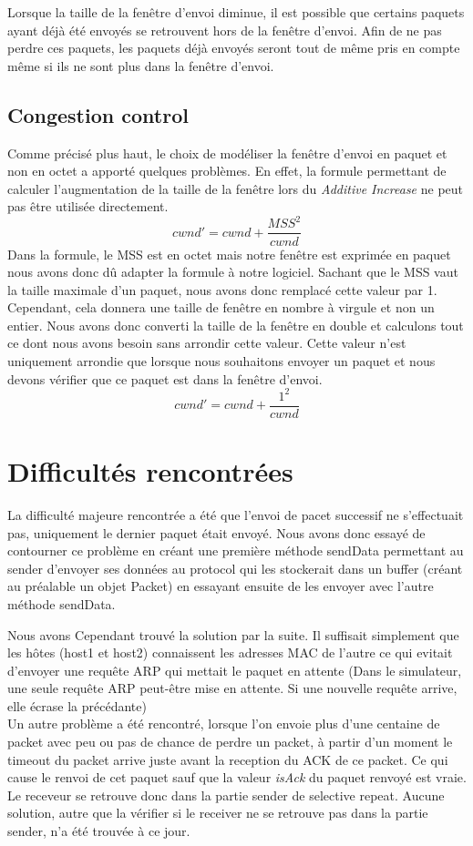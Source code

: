 \documentclass{article}
\begin{document}
Lorsque la taille de la fenêtre d'envoi diminue, il est possible que certains paquets ayant déjà été envoyés se retrouvent hors de la fenêtre d'envoi.
Afin de ne pas perdre ces paquets, les paquets déjà envoyés seront tout de même pris en compte même si ils ne sont plus dans la fenêtre d'envoi.


\subsection{Congestion control}
Comme précisé plus haut, le choix de modéliser la fenêtre d'envoi en paquet et non en octet a apporté quelques problèmes.
En effet, la formule permettant de calculer l'augmentation de la taille de la fenêtre lors du \textit{Additive Increase}
ne peut pas être utilisée directement.
\[
    cwnd' = cwnd + \frac{MSS^2}{cwnd}
\]
Dans la formule, le MSS est en octet mais notre fenêtre est exprimée en paquet nous avons donc dû adapter la formule à notre logiciel.
Sachant que le MSS vaut la taille maximale d'un paquet, nous avons donc remplacé cette valeur par 1.
Cependant, cela donnera une taille de fenêtre en nombre à virgule et non un entier. Nous avons donc converti la taille de la fenêtre
en double et calculons tout ce dont nous avons besoin sans arrondir cette valeur.
Cette valeur n'est uniquement arrondie que lorsque nous souhaitons envoyer un paquet et nous devons vérifier que ce paquet est dans la fenêtre d'envoi.
\[
    cwnd' = cwnd + \frac{1^2}{cwnd}
\]  

\newpage

\section{Difficultés rencontrées}
La difficulté majeure rencontrée a été que l'envoi de pacet successif ne s'effectuait pas, uniquement le dernier paquet était envoyé.
Nous avons donc essayé de contourner ce problème en créant une première méthode sendData permettant au sender d'envoyer ses données au protocol
qui les stockerait dans un buffer (créant au préalable un objet Packet) en essayant ensuite de les envoyer avec l'autre méthode sendData.

Nous avons Cependant trouvé la solution par la suite. Il suffisait simplement que les hôtes (host1 et host2) connaissent
les adresses MAC de l'autre ce qui evitait d'envoyer une requête ARP qui mettait le paquet en attente (Dans le simulateur, une seule requête ARP peut-être mise en attente. Si une nouvelle requête arrive, elle écrase la précédante)
\vspace{0.5cm} \\
\indent Un autre problème a été rencontré, lorsque l'on envoie plus d'une centaine de packet avec peu ou pas de chance de perdre un packet, 
à partir d'un moment le timeout du packet arrive juste avant la reception du ACK de ce packet. 
Ce qui cause le renvoi de cet paquet sauf que la valeur \emph{isAck} du paquet renvoyé est vraie.
Le receveur se retrouve donc dans la partie sender de selective repeat. 
Aucune solution, autre que la vérifier si le receiver ne se retrouve pas dans la partie sender, n'a été trouvée à ce jour.
\end{document}

